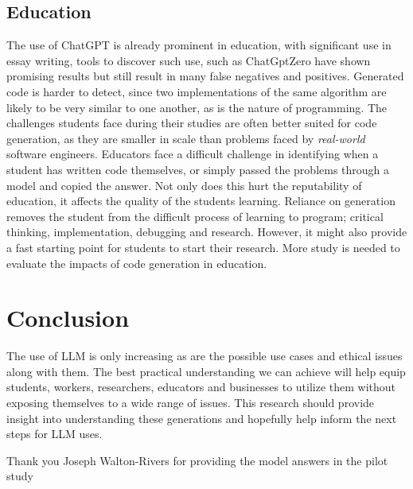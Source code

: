 \documentclass[manuscript,screen,review,sigconf]{acmart}
\begin{document}
\subsection{Education}
The use of ChatGPT is already prominent in education, with significant use in essay writing, tools to discover such use, such as ChatGptZero have shown promising results but still result in many false negatives and positives. Generated code is harder to detect, since two implementations of the same algorithm are likely to be very similar to one another, as is the nature of programming. The challenges students face during their studies are often better suited for code generation, as they are smaller in scale than problems faced by \textit{real-world} software engineers. Educators face a difficult challenge in identifying when a student has written code themselves, or simply passed the problems through a model and copied the answer. Not only does this hurt the reputability of education, it affects the quality of the students learning. Reliance on generation removes the student from the difficult process of learning to program; critical thinking, implementation, debugging and research. However, it might also provide a fast starting point for students to start their research. More study is needed to evaluate the impacts of code generation in education.

\section{Conclusion}
The use of LLM is only increasing as are the possible use cases and ethical issues along with them. The best practical understanding we can achieve will help equip students, workers, researchers, educators and businesses to utilize them without exposing themselves to a wide range of issues. This research should provide insight into understanding these generations and hopefully help inform the next steps for LLM uses.

\begin{acks}
Thank you Joseph Walton-Rivers for providing the model answers in the pilot study
\end{acks}
\end{document}
